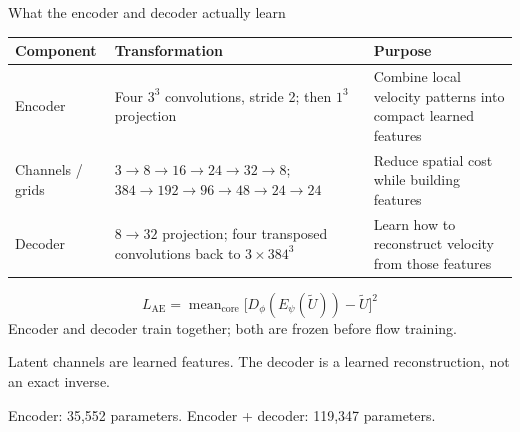 \documentclass[aspectratio=169,11pt]{beamer}
\newcommand{\keypoint}[1]{\begin{block}{}#1\end{block}}
\newcommand{\smallsource}[1]{\vfill{\tiny\color{muted}#1}}
\begin{document}
\begin{frame}{What the encoder and decoder actually learn}
  \small
  \begin{tabularx}{\linewidth}{lYY}
    \toprule
    Component & Transformation & Purpose \\
    \midrule
    Encoder & Four $3^3$ convolutions, stride 2; then $1^3$ projection &
    Combine local velocity patterns into compact learned features \\
    Channels / grids & $3\to8\to16\to24\to32\to8$; $384\to192\to96\to48\to24\to24$ &
    Reduce spatial cost while building features \\
    Decoder & $8\to32$ projection; four transposed convolutions back to $3\times384^3$ &
    Learn how to reconstruct velocity from those features \\
    \bottomrule
  \end{tabularx}
  \medskip
  \[
    L_{\mathrm{AE}}=\operatorname{mean}_{\mathrm{core}}
      \bigl[D_{\phi}(E_{\psi}(\widetilde U))-\widetilde U\bigr]^2
  \]
  Encoder and decoder train together; both are frozen before flow training.
  \keypoint{Latent channels are learned features. The decoder is a learned reconstruction, not an exact inverse.}
  \smallsource{Encoder: 35,552 parameters. Encoder + decoder: 119,347 parameters.}
\end{frame}
\end{document}
